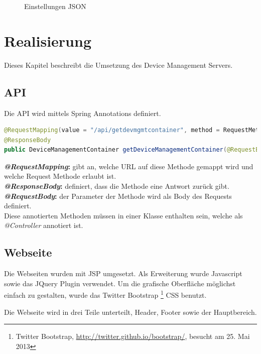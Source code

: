 \begin{figure}[H]
	\centering
	
	\caption{Einstellungen JSON}
\end{figure}



\section{Realisierung}
Dieses Kapitel beschreibt die Umsetzung des Device Management Servers.

\subsection{API}
Die API wird mittels Spring Annotations definiert. 

\begin{lstlisting}[language=Java, caption=Spring Annotation]
@RequestMapping(value = "/api/getdevmgmtcontainer", method = RequestMethod.POST)
@ResponseBody
public DeviceManagementContainer getDeviceManagementContainer(@RequestBody final StatusData request)

\end{lstlisting}
\textbf{\textit{@RequestMapping}:} gibt an, welche URL auf diese Methode gemappt wird und welche Request Methode erlaubt ist.\\
\textbf{\textit{@ResponseBody}: } definiert, dass die Methode eine Antwort zurück gibt.\\
\textbf{\textit{@RequestBody}: } der Parameter der Methode wird als Body des Requests definiert.\\
Diese annotierten Methoden müssen in einer Klasse enthalten sein, welche als \textit{@Controller} annotiert ist.


\subsection{Webseite}
Die Webseiten wurden mit JSP umgesetzt. Als Erweiterung wurde Javascript sowie das JQuery Plugin verwendet. Um die grafische Oberfläche möglichst einfach zu gestalten, wurde das Twitter Bootstrap \footnote{Twitter Bootstrap, \url{http://twitter.github.io/bootstrap/}, besucht am 25. Mai 2013} CSS benutzt.

Die Webseite wird in drei Teile unterteilt, Header, Footer sowie der Hauptbereich. 

